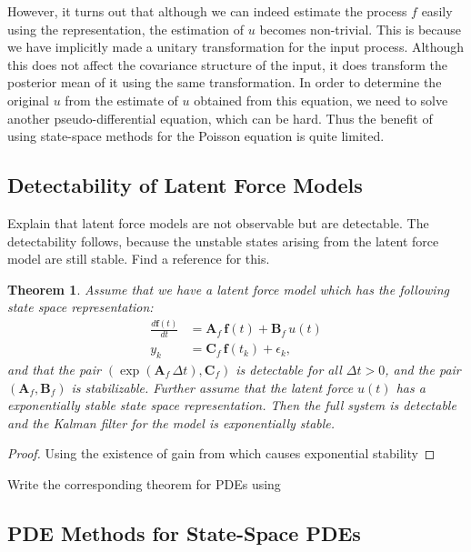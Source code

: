 \documentclass[journal]{IEEEtran}
\newtheorem{theorem}{Theorem}[section]
\newcommand{\simo}[1]{{\color{red}#1}}
\begin{document}
However, it turns out that although we can indeed estimate the process $f$ easily using the representation, the estimation of $u$ becomes non-trivial. This is because we have implicitly made a unitary transformation for the input process. Although this does not affect the covariance structure of the input, it does transform the posterior mean of it using the same transformation. In order to determine the original $u$ from the estimate of $u$ obtained from this equation, we need to solve another pseudo-differential equation, which can be hard. Thus the benefit of using state-space methods for the Poisson equation is quite limited. 

\subsection{Detectability of Latent Force Models}

\simo{Explain that latent force models are not observable but are detectable. The detectability follows, because the unstable states arising from the latent force model are still stable. Find a reference for this.}

\begin{theorem}
  Assume that we have a latent force model which has the following state space representation:
\begin{equation}
\begin{split}
  \frac{d\mathbf{f}(t)}{dt}
  &= \mathbf{A}_f \, \mathbf{f}(t) + \mathbf{B}_f \, u(t) \\
  y_k &= \mathbf{C}_f \, \mathbf{f}(t_k) + \epsilon_k,
\end{split}
\end{equation}
%
and that the pair $(\exp(\mathbf{A}_f \, \Delta t),\mathbf{C}_f)$ is detectable for all $\Delta t > 0$, and the pair $(\mathbf{A}_f,\mathbf{B}_f)$ is stabilizable. Further assume that the latent force $u(t)$ has a exponentially stable state space representation. Then the full system is \emph{detectable} and the Kalman filter for the model is exponentially stable.
\end{theorem}

\begin{proof}
  \simo{Using the existence of gain from \cite{Anderson:1981} which causes exponential stability}
\end{proof}

\simo{Write the corresponding theorem for PDEs using \cite{Curtain:2012}}

\subsection{PDE Methods for State-Space PDEs}
\end{document}
